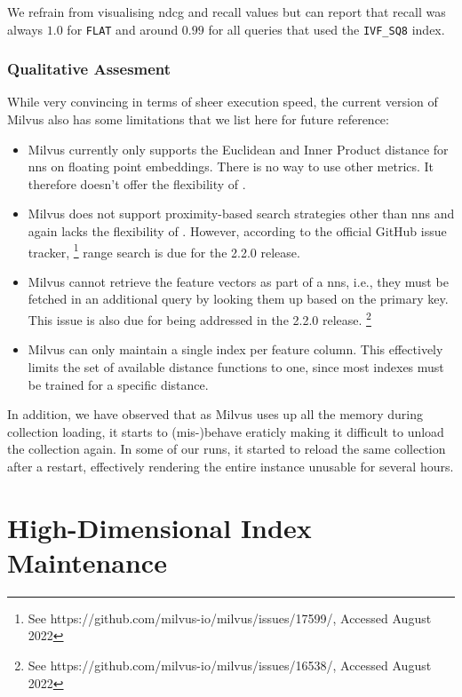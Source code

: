 We refrain from visualising n\acrshort{dcg} and recall values but can report that recall was always $1.0$ for \texttt{FLAT} and around $0.99$ for all queries that used the \texttt{IVF\_SQ8} index.

\subsubsection{Qualitative Assesment}
While very convincing in terms of sheer execution speed, the current version of Milvus also has some limitations that we list here for future reference:

\begin{itemize}
    \item Milvus currently only supports the Euclidean and Inner Product distance for \acrshort{nns} on floating point embeddings. There is no way to use other metrics. It therefore doesn't offer the flexibility of \cottontail{}.
    \item Milvus does not support proximity-based search strategies other than \acrshort{nns} and again lacks the flexibility of \cottontail{}. However, according to the official GitHub issue tracker, \footnote{See https://github.com/milvus-io/milvus/issues/17599/, Accessed August 2022} range search is due for the 2.2.0 release. 
    \item Milvus cannot retrieve the feature vectors as part of a \acrshort{nns}, i.e., they must be fetched in an additional query by looking them up based on the primary key. This issue is also due for being addressed in the 2.2.0 release. \footnote{See https://github.com/milvus-io/milvus/issues/16538/, Accessed August 2022}
    \item Milvus can only maintain a single index per feature column. This effectively limits the set of available distance functions to one, since most indexes must be trained for a specific distance.
\end{itemize}

In addition, we have observed that as Milvus uses up all the memory during collection loading, it starts to (mis-)behave eraticly making it difficult to unload the collection again. In some of our runs, it started to reload the same collection after a restart, effectively rendering the entire instance unusable for several hours.

\section{High-Dimensional Index Maintenance}
\label{section:hd_index_maintenance}

